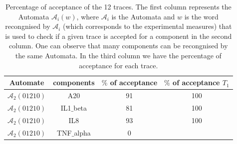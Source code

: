\begin{table}[!t]
\renewcommand{\arraystretch}{1.3}
\caption{Percentage of acceptance of the 12 traces. The first column represents the Automata $\mathcal{A}_{i}(w)$, where $\mathcal{A}_{i}$ is the Automata and $w$ is the word recongnised by $\mathcal{A}_{i}$ 
(which corresponds to the experimental measures) that is used to check if a given trace is accepted for a component in the second 
column. One can observe that many components can be recongnised by the same Automata. 
In the third column we have the percentage of acceptance for each trace.}
\label{traceAnalysis}
\centering
\begin{tabular}{|c|c||c|c|}
\hline

\textbf{Automate}

&

\textbf{components}

&

\textbf{$\%$ of acceptance}

&

\textbf{$\%$ of acceptance $T_{1}$}
\\ \hline

$\mathcal{A}_{2}(01210)$

&

A20

&

91

&

100
\\ \hline

$\mathcal{A}_{2}(01210)$

&

IL1$\_$beta

&

81

&

100
\\ \hline

$\mathcal{A}_{2}(01210)$

&

IL8

&

93

&

100

\\ \hline

$\mathcal{A}_{2}(01210)$

&

TNF$\_$alpha

&

0


\end{tabular}
\end{table}
